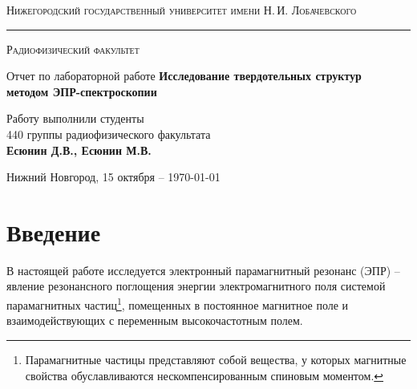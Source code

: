 \documentclass[a4paper,14pt]{extarticle}
\def\labauthors{Есюнин Д.В., Есюнин М.В.}
\begin{document}
\begin{titlepage}
\begin{center}
{\small\textsc{Нижегородский государственный университет имени Н.\,И. Лобачевского}}
\vskip 2pt \hrule \vskip 3pt
{\small\textsc{Радиофизический факультет}}

\vfill


{{\large Отчет по лабораторной работе}\vskip 12pt {\LARGE \bfseries Исследование твердотельных структур \\[0.2em] методом ЭПР-спектроскопии}}

	
\vspace{2cm}
{\large Работу выполнили студенты \\[-0.25em] 440 группы радиофизического факультата \\[0.5em] {\Large \bfseries \labauthors}}



\end{center}

\vfill
	
	
	
\begin{center}
	{Нижний Новгород, 15 октября -- \today}
\end{center}

\end{titlepage}
\tableofcontents
\newpage



\section*{Введение}
В настоящей работе исследуется электронный парамагнитный резонанс (ЭПР) -- явление резонансного поглощения энергии электромагнитного поля системой парамагнитных частиц\footnote{Парамагнитные частицы представляют собой вещества, у которых магнитные свойства обуславливаются нескомпенсированным спиновым моментом.}, помещенных в постоянное магнитное поле и взаимодействующих с переменным высокочастотным полем.
\end{document}
